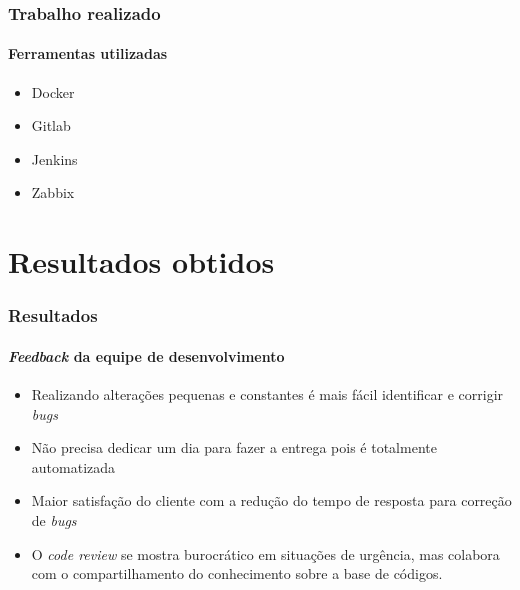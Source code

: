 \documentclass[aspectratio=169]{beamer}
\begin{document}
\begin{frame}
	\frametitle{Trabalho realizado}
	\framesubtitle{Ferramentas utilizadas}
	
	\begin{itemize}
		
		\item Docker 
		
		\item Gitlab
		
		\item Jenkins
		
		\item Zabbix
		
	\end{itemize}
	
\end{frame}

\section{Resultados obtidos}

\begin{frame}
	\frametitle{Resultados}
	\framesubtitle{\textit{Feedback} da equipe de desenvolvimento}
	
	\begin{itemize}
		
		\item Realizando alterações pequenas e constantes é mais fácil identificar e corrigir \textit{bugs}
		
		\item Não precisa dedicar um dia para fazer a entrega pois é totalmente automatizada
		
		\item Maior satisfação do cliente com a redução do tempo de resposta para correção de \textit{bugs} 
		
		\item O \textit{code review} se mostra burocrático em situações de urgência, mas colabora com o compartilhamento do conhecimento sobre a base de códigos.
		
	\end{itemize}
	
\end{frame}
\end{document}
